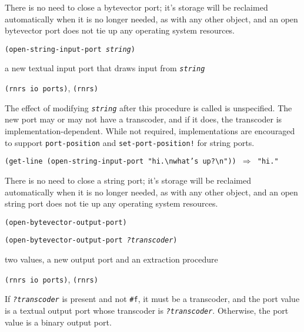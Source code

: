 There is no need to close a bytevector port; it's storage will be reclaimed
automatically when it is no longer needed, as with any other object, and
an open bytevector port does not tie up any operating system resources.


\begin{description}

\label{io_s35}\item[procedure] \texttt{(open-string-input-port \textit{string})}



\item[returns] a new textual input port that draws input from \texttt{\textit{string}}


\item[libraries] \texttt{(rnrs io ports)}, \texttt{(rnrs)}
\end{description}


The effect of modifying \texttt{\textit{string}} after this procedure is called
is unspecified.
The new port may or may not have a transcoder, and if it does, the transcoder
is implementation-dependent.
While not required, implementations are encouraged to support \texttt{port-position}
and \texttt{set-port-position!} for string ports.


\texttt{(get-line (open-string-input-port "hi.\textbackslash{}nwhat's up?\textbackslash{}n")) \(\Rightarrow\) "hi."}

There is no need to close a string port; it's storage will be reclaimed
automatically when it is no longer needed, as with any other object, and
an open string port does not tie up any operating system resources.

\begin{description}

\label{io_s36}\item[procedure] \texttt{(open-bytevector-output-port)}



\item[procedure] \texttt{(open-bytevector-output-port \textit{?transcoder})}



\item[returns] two values, a new output port and an extraction procedure


\item[libraries] \texttt{(rnrs io ports)}, \texttt{(rnrs)}
\end{description}


If \texttt{\textit{?transcoder}} is present and not \texttt{\#{}f}, it must be a
transcoder, and the port value is a textual output port
whose transcoder is \texttt{\textit{?transcoder}}.
Otherwise, the port value is a binary output port.


